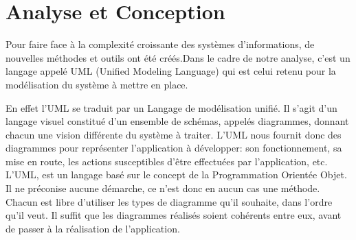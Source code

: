 \section{Analyse et Conception}


Pour faire face à la complexité croissante des systèmes d’informations, de
nouvelles méthodes et outils ont été créés.Dans le cadre de notre analyse,
c’est un langage appelé UML (Unified Modeling Language) qui est celui retenu pour la modélisation du système à mettre en place.

En effet l'UML se traduit par un Langage de modélisation unifié. Il s’agit d’un langage visuel constitué d’un ensemble de schémas, appelés diagrammes, donnant chacun une vision différente du système à traiter. L'UML nous fournit donc des diagrammes pour représenter l’application à développer: son fonctionnement, sa mise en route, les actions susceptibles d’être effectuées par l’application, etc. L'UML, est un langage basé sur le concept de la Programmation Orientée Objet. Il ne préconise aucune démarche, ce n’est donc en aucun cas une méthode. Chacun est libre d’utiliser les types de diagramme qu’il souhaite, dans l’ordre qu’il veut. Il suffit que les diagrammes réalisés soient cohérents entre eux, avant de passer à la réalisation de l’application.











